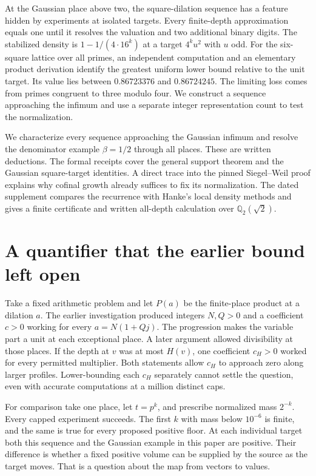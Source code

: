 \documentclass[12pt,letterpaper]{article}
\begin{document}
\par
At the Gaussian place above two, the square-dilation sequence has a feature hidden by experiments at isolated targets. Every finite-depth approximation equals one until it resolves the valuation and two additional binary digits. The stabilized density is $1-1/(4\cdot16^k)$ at a target $4^ku^2$ with $u$ odd. For the six-square lattice over all primes, an independent computation and an elementary product derivation identify the greatest uniform lower bound relative to the unit target. Its value lies between $0.86723376$ and $0.86724245$. The limiting loss comes from primes congruent to three modulo four. We construct a sequence approaching the infimum and use a separate integer representation count to test the normalization.
\par
We characterize every sequence approaching the Gaussian infimum and resolve the denominator example $\beta=1/2$ through all places. These are written deductions. The formal receipts cover the general support theorem and the Gaussian square-target identities. A direct trace into the pinned Siegel--Weil proof explains why cofinal growth already suffices to fix its normalization. The dated supplement compares the recurrence with Hanke’s local density methods and gives a finite certificate and written all-depth calculation over $\mathbb Q_2(\sqrt2)$.
\clearpage{\small\setlength{\parskip}{0pt}\tableofcontents}\clearpage{}
\section{A quantifier that the earlier bound left open}
Take a fixed arithmetic problem and let $P(a)$ be the finite-place product at a dilation $a$. The earlier investigation produced integers $N,Q>0$ and a coefficient $c>0$ working for every $a=N(1+Qj)$. The progression makes the variable part a unit at each exceptional place. A later argument allowed divisibility at those places. If the depth at $v$ was at most $H(v)$, one coefficient $c_H>0$ worked for every permitted multiplier. Both statements allow $c_H$ to approach zero along larger profiles. Lower-bounding each $c_H$ separately cannot settle the question, even with accurate computations at a million distinct caps.
\par
For comparison take one place, let $t=p^k$, and prescribe normalized mass $2^{-k}$. Every capped experiment succeeds. The first $k$ with mass below $10^{-6}$ is finite, and the same is true for every proposed positive floor. At each individual target both this sequence and the Gaussian example in this paper are positive. Their difference is whether a fixed positive volume can be supplied by the source as the target moves. That is a question about the map from vectors to values.
\end{document}

